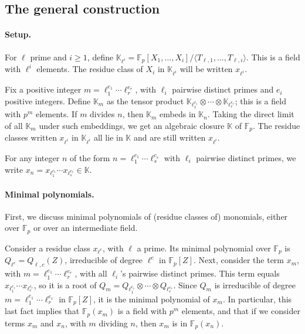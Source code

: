 \documentclass{sig-alternate}
\def\F {\ensuremath{\mathbb{F}}}
\def\K {\ensuremath{\mathbb{K}}}
\begin{document}
\subsection{The general construction}

\paragraph{Setup.} For $\ell$ prime and $i \ge 1$, define
$\K_{\ell^i}=\F_p[X_1,\dots,X_i]/\langle
T_{\ell,1},\dots,T_{\ell,i}\rangle$. This is a field with $\ell^i$
elements.  The residue class of $X_i$ in $\K_{\ell^i}$ will be written
$x_{\ell^i}$.

Fix a positive integer $m=\ell_1^{e_1}\cdots \ell_r^{e_r}$, with
$\ell_i$ pairwise distinct primes and $e_i$ positive integers.  Define
$\K_m$ as the tensor product $\K_{\ell_1^{e_1}} \otimes \cdots \otimes
\K_{\ell_r^{e_r}}$; this is a field with $p^m$ elements.  If $m$
divides $n$, then $\K_m$ embeds in $\K_n$. Taking the direct limit of
all $\K_m$ under such embeddings, we get an algebraic closure $\K$ of
$\F_p$. The residue classes written $x_{\ell^i}$ in $\K_{\ell^i}$ all
lie in $\K$ and are still written $x_{\ell^i}$.

For any integer $n$ of the form $n=\ell_1^{c_1}\cdots \ell_s^{c_s}$
with $\ell_i$ pairwise distinct primes, we write $x_n =
x_{\ell_1^{c_1}} \cdots x_{\ell_s^{c_s}} \in \K$.



\paragraph{Minimal polynomials.}
First, we discuss minimal polynomials of (residue classes of)
monomials, either over $\F_p$ or over an intermediate field.

Consider a residue class $x_{\ell^{c}}$, with $\ell$ a prime. Its
minimal polynomial over $\F_p$ is $Q_{\ell^c}=Q_{\ell,c}(Z)$,
irreducible of degree $\ell^{c}$ in $\F_p[Z]$. Next, consider the term
$x_m$, with $m=\ell_1^{e_1}\cdots \ell_r^{e_r}$, with all $\ell_i$'s
pairwise distinct primes. This term equals $x_{\ell_1^{e_1}} \cdots
x_{\ell_r^{e_r}}$, so it is a root of $Q_{m}=Q_{\ell_1^{e_1}} \otimes
\cdots \otimes Q_{\ell_r^{e_r}}.$ Since $Q_m$ is irreducible of degree
$m=\ell_1^{e_1}\cdots \ell_r^{e_r}$ in $\F_p[Z]$, it is the minimal
polynomial of $x_m$.  In particular, this last fact implies that
$\F_p(x_m)$ is a field with $p^m$ elements, and that if we consider
terms $x_m$ and $x_n$, with $m$ dividing $n$, then $x_m$ is in
$\F_p(x_n)$.
\end{document}
